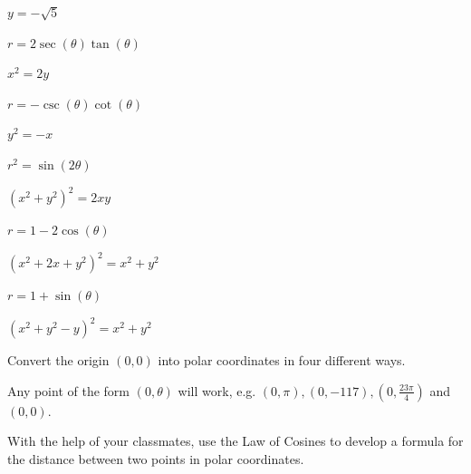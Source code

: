 \documentclass{ximera}
\begin{document}
\begin{question}
\begin{problem}
\begin{solution}
$y= -\sqrt{5}$
\end{solution}
\end{problem}

\begin{problem}
$r = 2\sec(\theta)\tan(\theta)$

\begin{solution}
$x^2=2y$
\end{solution}
\end{problem}

\begin{problem}
$r = -\csc(\theta) \cot(\theta)$

\begin{solution}
$y^2=-x$
\end{solution}
\end{problem}

\begin{problem}
$r^{2} = \sin(2\theta)$

\begin{solution}
$\left( x^{2} + y^{2} \right)^{2} = 2xy$
\end{solution}
\end{problem}

\begin{problem}
$r = 1 - 2\cos(\theta)$

\begin{solution}
$\left( x^{2} + 2x + y^{2} \right)^{2} = x^{2} + y^{2}$
\end{solution}
\end{problem}

\begin{problem} \label{equpolartorectlast}
$r = 1 + \sin(\theta)$

\begin{solution}
$\left( x^{2} + y^{2} - y\right)^{2} = x^{2} + y^{2}$
\end{solution}
\end{problem}

\end{question}

\begin{problem} Convert the origin $(0,0)$ into polar coordinates in four different ways.

\begin{solution}
Any point of the form $(0, \theta)$ will work, e.g. $(0, \pi), (0, -117), \left( 0, \frac{23\pi}{4} \right) $ and $(0, 0)$.
\end{solution}
\end{problem}

\begin{problem}
With the help of your classmates, use the Law of Cosines to develop a formula for the distance between two points in polar coordinates.
\end{problem}
\end{document}
